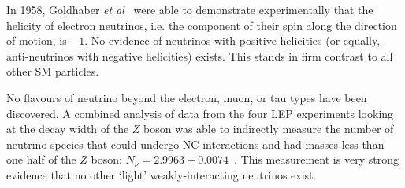 In 1958, Goldhaber \textit{et al}~\cite{goldhaberHelicityNeutrinos1958} were able to demonstrate experimentally that the helicity of electron neutrinos, i.e. the component of their spin along the direction of motion, is $-1$. No evidence of neutrinos with positive helicities (or equally, anti-neutrinos with negative helicities) exists. This stands in firm contrast to all other SM particles.

No flavours of neutrino beyond the electron, muon, or tau types have been discovered. A combined analysis of data from the four LEP experiments looking at the decay width of the $Z$ boson was able to indirectly measure the number of neutrino species that could undergo NC interactions and had masses less than one half of the $Z$ boson: $N_{\nu} = 2.9963\pm0.0074$~\cite{PrecisionElectroweakMeasurements2006,janotImprovedBhabhaCross2020}. %
This measurement is very strong evidence that no other `light' weakly-interacting neutrinos exist.



